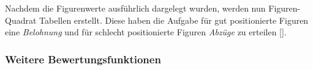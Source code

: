 Nachdem die Figurenwerte ausführlich dargelegt wurden, werden nun Figuren-Quadrat Tabellen erstellt.
Diese haben die Aufgabe für gut positionierte Figuren eine \textit{Belohnung} und für schlecht positionierte Figuren \textit{Abzüge} zu erteilen [\cite{Wiki2018}].


\subsubsection{Weitere Bewertungsfunktionen}

